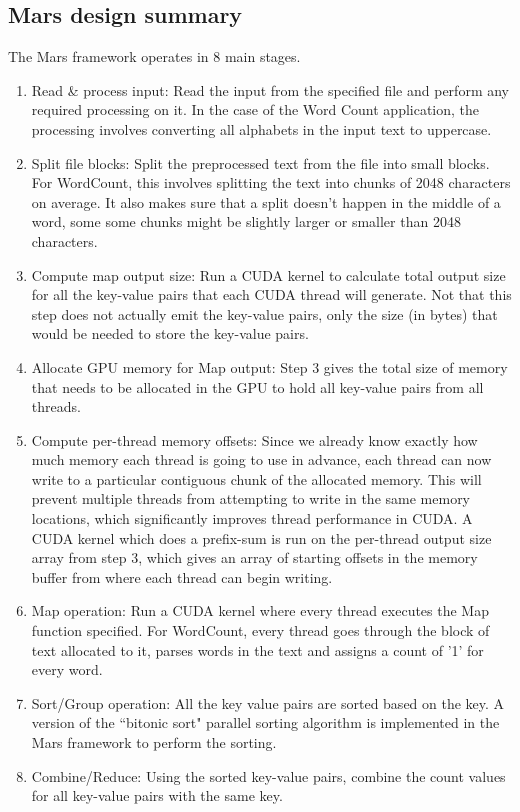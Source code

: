 \documentclass{article}
\begin{document}
\subsection{Mars design summary} \label{mars-design-summary}
The Mars framework operates in 8 main stages. 
\begin{enumerate}
    \item Read \& process input: Read the input from the specified file and perform any required processing on it. In the case of the Word Count application, the processing involves converting all alphabets in the input text to uppercase. 
    \item Split file blocks: Split the preprocessed text from the file into small blocks. For WordCount, this involves splitting the text into chunks of 2048 characters on average. It also makes sure that a split doesn't happen in the middle of a word, some some chunks might be slightly larger or smaller than 2048 characters.
    \item Compute map output size: Run a CUDA kernel to calculate total output size for all the key-value pairs that each CUDA thread will generate. Not that this step does not actually emit the key-value pairs, only the size (in bytes) that would be needed to store the key-value pairs. 
    \item Allocate GPU memory for Map output: Step 3 gives the total size of memory that needs to be allocated in the GPU to hold all key-value pairs from all threads. 
    \item Compute per-thread memory offsets: Since we already know exactly how much memory each thread is going to use in advance, each thread can now write to a particular contiguous chunk of the allocated memory. This will prevent multiple threads from attempting to write in the same memory locations, which significantly improves thread performance in CUDA. A CUDA kernel which does a prefix-sum is run on the per-thread output size array from step 3, which gives an array of starting offsets in the memory buffer from where each thread can begin writing. 
    \item Map operation: Run a CUDA kernel where every thread executes the Map function specified. For WordCount, every thread goes through the block of text allocated to it, parses words in the text and assigns a count of '1' for every word.
    \item Sort/Group operation: All the key value pairs are sorted based on the key. A version of the ``bitonic sort" parallel sorting algorithm \cite{bitonic_sort} is implemented in the Mars framework to perform the sorting.
    \item Combine/Reduce: Using the sorted key-value pairs, combine the count values for all key-value pairs with the same key.
\end{enumerate}
\end{document}
